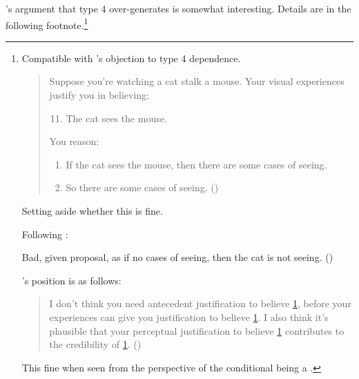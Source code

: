 \begin{note}
  \citeauthor{Pryor:2004ws}'s argument that type 4 over-generates is somewhat interesting.
  Details are in the following footnote.\footnote{
  Compatible with \citeauthor{Pryor:2004ws}'s objection to type 4 dependence.

    \begin{quote}
      Suppose you're watching a cat stalk a mouse. Your visual experiences justify you in believing:

      \begin{enumerate}[label=(\arabic*), ref=(\arabic*)]
        \setcounter{enumi}{10}
      \item
        \label{illu:Pryor:cat:1}
        The cat sees the mouse.
      \end{enumerate}

      You reason:

      \begin{enumerate}[label=(\arabic*), ref=(\arabic*), resume]
      \item
        \label{illu:Pryor:cat:2}
        If the cat sees the mouse, then there are some cases of seeing.
      \item
        \label{illu:Pryor:cat:3}
        So there are some cases of seeing.\nolinebreak
        \mbox{}\hfill\mbox{(\citeyear[361]{Pryor:2004ws})}
      \end{enumerate}
    \end{quote}

  Setting aside whether this is fine.

  Following \citeauthor{Pryor:2004ws}:

  Bad, given proposal, as if no cases of seeing, then the cat is not seeing. (\citeyear[361]{Pryor:2004ws})

  \citeauthor{Pryor:2004ws}'s position is as follows:

  \begin{quote}
    I don't think you need antecedent justification to believe \ref{illu:Pryor:cat:3}, before your experiences can give you justification to believe \ref{illu:Pryor:cat:1}.
    I also think it's plausible that your perceptual justification to believe \ref{illu:Pryor:cat:1} contributes to the credibility of \ref{illu:Pryor:cat:3}.\nolinebreak
    \mbox{}\hfill\mbox{(\citeyear[361]{Pryor:2004ws})}
  \end{quote}

  This fine when seen from the perspective of the conditional being a \requ{}.
  }
\end{note}


